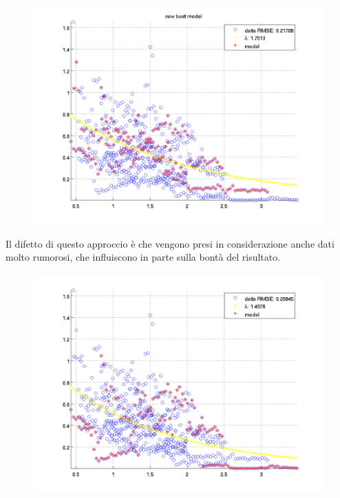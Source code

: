 \documentclass[12pt]{report}
\begin{document}
\begin{figure}[H]
	\centering
	\includegraphics[scale=0.55]{images/ransac1}
	\label{fig:tryLam}
\end{figure}

\noindent Il difetto di questo approccio \`e che vengono presi in considerazione anche dati molto rumorosi, che influiscono in parte sulla bont\`a del risultato.

\begin{figure}[H]
	\centering
	\includegraphics[scale=0.55]{images/ransacWin}
	\label{fig:ransac}
\end{figure}
\end{document}

